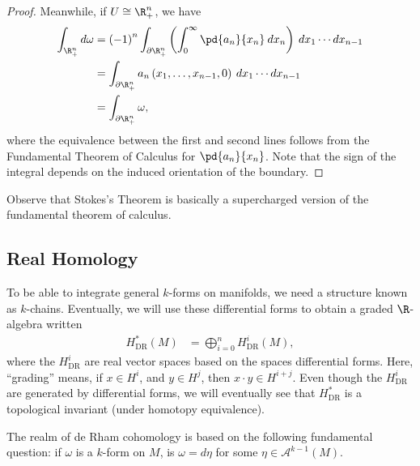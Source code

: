 \documentclass[10pt]{mypackage}
\begin{document}
\begin{proof}
  Meanwhile, if $U\cong \R^{n}_{+}$, we have
  \begin{align*}
    \int_{ \R^{n}_{+} }^{}d\omega &= \left( -1 \right)^{n} \int_{\partial \R^{n}_{+}}^{} \left( \int_{0}^{\infty} \pd{a_n}{x_n}\:dx_n \right)\:dx_1\cdots dx_{n-1}\\
                                  &= \int_{\partial \R^{n}_{+}}^{} a_n\left( x_1,\dots,x_{n-1},0 \right)\:dx_1\cdots dx_{n-1}\\
                                  &= \int_{\partial \R^{n}_{+}}^{}\omega,
  \end{align*}
  where the equivalence between the first and second lines follows from the Fundamental Theorem of Calculus for $ \pd{a_n}{x_n} $. Note that the sign of the integral depends on the induced orientation of the boundary.
\end{proof}
Observe that Stokes's Theorem is basically a supercharged version of the fundamental theorem of calculus.
\subsection{Real Homology}%
To be able to integrate general $k$-forms on manifolds, we need a structure known as $k$-chains. Eventually, we will use these differential forms to obtain a graded $\R$-algebra written
\begin{align*}
  H^{\ast}_{\operatorname{DR}}\left( M \right) &= \bigoplus_{i=0}^{n} H^{i}_{\operatorname{DR}}\left( M \right),
\end{align*}
where the $H^{i}_{\operatorname{DR}}$ are real vector spaces based on the spaces differential forms. Here, ``grading'' means, if $x\in H^i$, and $y\in H^{j}$, then $x\cdot y\in H^{i + j}$. Even though the $H^{i}_{\operatorname{DR}}$ are generated by differential forms, we will eventually see that $H^{\ast}_{\operatorname{DR}}$ is a topological invariant (under homotopy equivalence).\newline

The realm of de Rham cohomology is based on the following fundamental question: if $\omega$ is a $k$-form on $M$, is $\omega = d\eta$ for some $\eta\in \mathcal{A}^{k-1}\left( M \right)$.\newline
\end{document}
